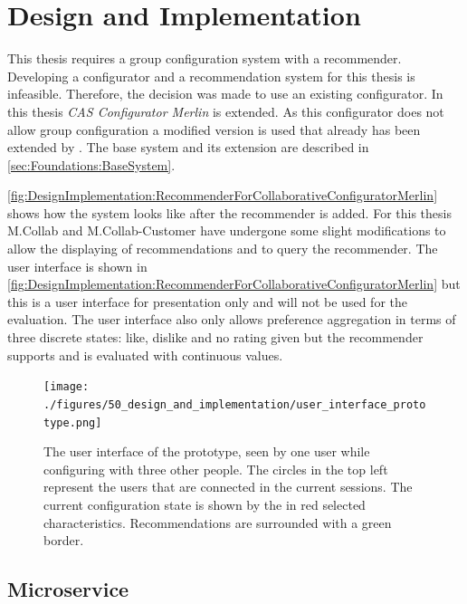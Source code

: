 \chapter{Design and Implementation}
\label{ch:DesignImplementation}

This thesis requires a group configuration system with a recommender. Developing a configurator and a recommendation system for this thesis is infeasible. Therefore, the decision was made to use an existing configurator. In this thesis \emph{CAS Configurator Merlin} \cite{IndustrySpecificProduct2020} is extended. As this configurator does not allow group configuration a modified version is used that already has been extended by \citeauthor{raabKollaborativeProduktkonfigurationEchtzeit2019} \cite{raabKollaborativeProduktkonfigurationEchtzeit2019}. The base system and its extension are described in \autoref{sec:Foundations:BaseSystem}.

\autoref{fig:DesignImplementation:RecommenderForCollaborativeConfiguratorMerlin} shows how the system looks like after the recommender is added. For this thesis M.Collab and M.Collab-Customer have undergone some slight modifications to allow the displaying of recommendations and to query the recommender. The user interface is shown in \autoref{fig:DesignImplementation:RecommenderForCollaborativeConfiguratorMerlin} but this is a user interface for presentation only and will not be used for the evaluation. The user interface also only allows preference aggregation in terms of three discrete states: like, dislike and no rating given but the recommender supports and is evaluated with continuous values.

\begin{figure}
    \centering
    \texttt{[image: ./figures/50\_design\_and\_implementation/user\_interface\_prototype.png]}
    \caption{The user interface of the prototype, seen by one user while configuring with three other people. The circles in the top left represent the users that are connected in the current sessions. The current configuration state is shown by the in red selected characteristics. Recommendations are surrounded with a green border.}
    \label{fig:DesignImplementation:UserInterface}
\end{figure}


\section{Microservice}
\label{sec:DesignImplementation:Microservice}

